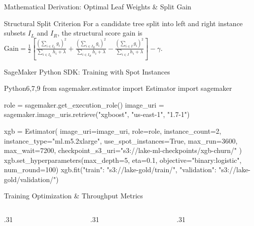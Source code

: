 \documentclass[aspectratio=169,10pt]{beamer}
\begin{document}
\begin{frame}{Mathematical Derivation: Optimal Leaf Weights \& Split Gain}
  \vspace{0.20cm}
  \begin{ConceptBox}{Structural Split Criterion}
    For a candidate tree split into left and right instance subsets $I_L$ and $I_R$, the structural score gain is $\text{Gain} = \frac{1}{2} \left[ \frac{(\sum_{i \in I_L} g_i)^2}{\sum_{i \in I_L} h_i + \lambda} + \frac{(\sum_{i \in I_R} g_i)^2}{\sum_{i \in I_R} h_i + \lambda} - \frac{(\sum_{i \in I} g_i)^2}{\sum_{i \in I} h_i + \lambda} \right] - \gamma$.
  \end{ConceptBox}
\end{frame}

\begin{frame}[fragile]{SageMaker Python SDK: Training with Spot Instances}
  \begin{HighlightedCodeBlock}{Python}{6,7,9}
from sagemaker.estimator import Estimator
import sagemaker

role = sagemaker.get_execution_role()
image_uri = sagemaker.image_uris.retrieve("xgboost", "us-east-1", "1.7-1")

xgb = Estimator(
    image_uri=image_uri, role=role,
    instance_count=2, instance_type="ml.m5.2xlarge",
    use_spot_instances=True, max_run=3600, max_wait=7200,
    checkpoint_s3_uri="s3://lake-ml-checkpoints/xgb-churn/"
)
xgb.set_hyperparameters(max_depth=5, eta=0.1, objective="binary:logistic", num_round=100)
xgb.fit({"train": "s3://lake-gold/train/", "validation": "s3://lake-gold/validation/"})
  \end{HighlightedCodeBlock}
\end{frame}

\begin{frame}{Training Optimization \& Throughput Metrics}
  \begin{columns}[T,onlytextwidth]
    \begin{column}{.31\textwidth}
    \end{column}
    \begin{column}{.31\textwidth}
    \end{column}
    \begin{column}{.31\textwidth}
    \end{column}
  \end{columns}
  \vspace{0.20cm}
\end{frame}
\end{document}
